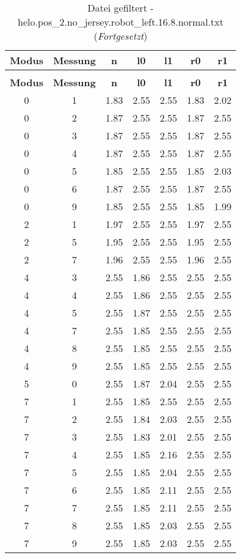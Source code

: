 \begin{longtable}{|c|c||c||c|c||c|c|}
	\caption{Datei gefiltert - helo.pos\_2.no\_jersey.robot\_left.16.8.normal.txt} \label{tab:helo.pos-2.no-jersey.robot-left.16.8.normal.txt} \\ \hline
	\textbf{Modus} & \textbf{Messung} & \textbf{n} & \textbf{l0} & \textbf{l1} & \textbf{r0} & \textbf{r1}\\ \hline
	\endfirsthead
	\caption[]{Datei gefiltert - helo.pos\_2.no\_jersey.robot\_left.16.8.normal.txt (\emph{Fortgesetzt})} \\ \hline
	\textbf{Modus} & \textbf{Messung} & \textbf{n} & \textbf{l0} & \textbf{l1} & \textbf{r0} & \textbf{r1}\\ \hline
	\endhead
	0 & 1 & 1.83 & 2.55 & 2.55 & 1.83 & 2.02 \\ \hline
	0 & 2 & 1.87 & 2.55 & 2.55 & 1.87 & 2.55 \\ \hline
	0 & 3 & 1.87 & 2.55 & 2.55 & 1.87 & 2.55 \\ \hline
	0 & 4 & 1.87 & 2.55 & 2.55 & 1.87 & 2.55 \\ \hline
	0 & 5 & 1.85 & 2.55 & 2.55 & 1.85 & 2.03 \\ \hline
	0 & 6 & 1.87 & 2.55 & 2.55 & 1.87 & 2.55 \\ \hline
	0 & 9 & 1.85 & 2.55 & 2.55 & 1.85 & 1.99 \\ \hline
	2 & 1 & 1.97 & 2.55 & 2.55 & 1.97 & 2.55 \\ \hline
	2 & 5 & 1.95 & 2.55 & 2.55 & 1.95 & 2.55 \\ \hline
	2 & 7 & 1.96 & 2.55 & 2.55 & 1.96 & 2.55 \\ \hline
	4 & 3 & 2.55 & 1.86 & 2.55 & 2.55 & 2.55 \\ \hline
	4 & 4 & 2.55 & 1.86 & 2.55 & 2.55 & 2.55 \\ \hline
	4 & 5 & 2.55 & 1.87 & 2.55 & 2.55 & 2.55 \\ \hline
	4 & 7 & 2.55 & 1.85 & 2.55 & 2.55 & 2.55 \\ \hline
	4 & 8 & 2.55 & 1.85 & 2.55 & 2.55 & 2.55 \\ \hline
	4 & 9 & 2.55 & 1.85 & 2.55 & 2.55 & 2.55 \\ \hline
	5 & 0 & 2.55 & 1.87 & 2.04 & 2.55 & 2.55 \\ \hline
	7 & 1 & 2.55 & 1.85 & 2.55 & 2.55 & 2.55 \\ \hline
	7 & 2 & 2.55 & 1.84 & 2.03 & 2.55 & 2.55 \\ \hline
	7 & 3 & 2.55 & 1.83 & 2.01 & 2.55 & 2.55 \\ \hline
	7 & 4 & 2.55 & 1.85 & 2.16 & 2.55 & 2.55 \\ \hline
	7 & 5 & 2.55 & 1.85 & 2.04 & 2.55 & 2.55 \\ \hline
	7 & 6 & 2.55 & 1.85 & 2.11 & 2.55 & 2.55 \\ \hline
	7 & 7 & 2.55 & 1.85 & 2.11 & 2.55 & 2.55 \\ \hline
	7 & 8 & 2.55 & 1.85 & 2.03 & 2.55 & 2.55 \\ \hline
	7 & 9 & 2.55 & 1.85 & 2.03 & 2.55 & 2.55 \\ \hline
\end{longtable}

